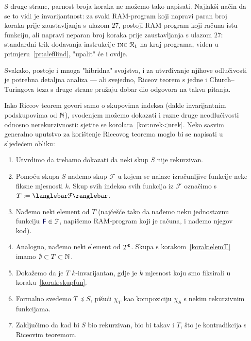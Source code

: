 S druge strane, parnost broja koraka ne možemo tako napisati. Najlakši način da se to vidi je invarijantnost: za svaki RAM-program koji napravi paran broj koraka prije zaustavljanja s ulazom $27$, postoji RAM-program koji računa istu funkciju, ali napravi neparan broj koraka prije zaustavljanja s ulazom $27$: standardni trik dodavanja instrukcije $\textsc{inc}\;\mathcal R_{1}$ na kraj programa, viđen u primjeru~\ref{pr:alef0ind}, "upalit" će i ovdje.

Svakako, postoje i mnoga "hibridna" svojstva, i za utvrđivanje njihove odlučivosti je potrebna detaljna analiza --- ali svejedno, Riceov teorem s jedne i Church--\!Turingova teza s druge strane pružaju dobar dio odgovora na takva pitanja.

Iako Riceov teorem govori samo o skupovima indeksa (dakle invarijantnim podskupovima od ${\mathbb N}$), svođenjem možemo dokazati i razne druge neodlučivosti odnosno nerekurzivnosti: sjetite se korolara~\ref{kor:nrek<nrek}. Neko sasvim generalno uputstvo za korištenje Riceovog teorema moglo bi se napisati u sljedećem obliku:

\begin{enumerate}
    \item Utvrdimo da trebamo dokazati da neki skup $S$ nije rekurzivan.
    \item\label{korak:skupfun} Pomoću skupa $S$ nađemo skup $\mathcal F$ u kojem se nalaze izračunljive funkcije neke fiksne mjesnosti $k$.
    Skup svih indeksa svih funkcija iz $\mathcal F$ označimo s $T:=\knk{\mathcal F}$.
    \item\label{korak:elemT} Nađemo neki element od $T$ (najčešće tako da nađemo neku jednostavnu funkciju $\f F\in\mathcal F$, napišemo RAM-program koji je računa, i nađemo njegov kod).
    \item Analogno, nađemo neki element od $T\sp{{\scriptscriptstyle\complement}}$. Skupa s korakom~\ref{korak:elemT} imamo $\emptyset\subset T\subset{\mathbb N}$.
    \item Dokažemo da je $T$ $k$-invarijantan, gdje je $k$ mjesnost koju smo fiksirali u koraku~\ref{korak:skupfun}.
    \item Formalno svedemo $T\!\preceq S$, pišući $\chi_T$ kao kompoziciju $\chi_S$ s nekim rekurzivnim funkcijama.
    \item Zaključimo da kad bi $S$ bio rekurzivan, bio bi takav i $T$, što je kontradikcija s Riceovim teoremom.
\end{enumerate}

